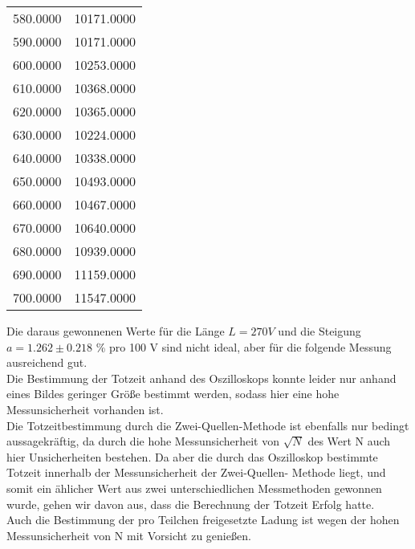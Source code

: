 \begin{table}[H]
\begin{tabular}{c c}
    580.0000 & 10171.0000 \\   
    590.0000 & 10171.0000 \\   
    600.0000 & 10253.0000 \\   
    610.0000 & 10368.0000 \\   
    620.0000 & 10365.0000 \\   
    630.0000 & 10224.0000 \\   
    640.0000 & 10338.0000 \\   
    650.0000 & 10493.0000 \\   
    660.0000 & 10467.0000 \\   
    670.0000 & 10640.0000 \\
    680.0000 & 10939.0000 \\   
    690.0000 & 11159.0000 \\
    700.0000 & 11547.0000 \\ 
    \bottomrule
  \end{tabular}
\end{table}
Die daraus gewonnenen Werte für die Länge $L= 270 V$ und die Steigung $a = 1.262 \pm 0.218$ \% 
pro 100 V sind nicht ideal, aber für die folgende Messung ausreichend gut. \\
Die Bestimmung der Totzeit anhand des Oszilloskops konnte leider nur anhand eines Bildes 
geringer Größe bestimmt werden, sodass hier eine hohe Messunsicherheit vorhanden ist.\\
Die Totzeitbestimmung durch die Zwei-Quellen-Methode ist ebenfalls nur bedingt aussagekräftig,
da durch die hohe Messunsicherheit von $\sqrt{N}$ des Wert N auch hier Unsicherheiten bestehen.
Da aber die durch das Oszilloskop bestimmte Totzeit innerhalb der Messunsicherheit der Zwei-Quellen-
Methode liegt, und somit ein ählicher Wert aus zwei unterschiedlichen Messmethoden gewonnen 
wurde, gehen wir davon aus, dass die Berechnung der Totzeit Erfolg hatte.\\
Auch die Bestimmung der pro Teilchen freigesetzte Ladung ist wegen der hohen Messunsicherheit von 
N mit Vorsicht zu genießen.
